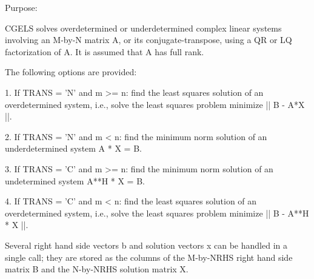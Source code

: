  \begin{DoxyParagraph}{Purpose\+: }
\begin{DoxyVerb} CGELS solves overdetermined or underdetermined complex linear systems
 involving an M-by-N matrix A, or its conjugate-transpose, using a QR
 or LQ factorization of A.  It is assumed that A has full rank.

 The following options are provided:

 1. If TRANS = 'N' and m >= n:  find the least squares solution of
    an overdetermined system, i.e., solve the least squares problem
                 minimize || B - A*X ||.

 2. If TRANS = 'N' and m < n:  find the minimum norm solution of
    an underdetermined system A * X = B.

 3. If TRANS = 'C' and m >= n:  find the minimum norm solution of
    an undetermined system A**H * X = B.

 4. If TRANS = 'C' and m < n:  find the least squares solution of
    an overdetermined system, i.e., solve the least squares problem
                 minimize || B - A**H * X ||.

 Several right hand side vectors b and solution vectors x can be
 handled in a single call; they are stored as the columns of the
 M-by-NRHS right hand side matrix B and the N-by-NRHS solution
 matrix X.\end{DoxyVerb}
 
\end{DoxyParagraph}

